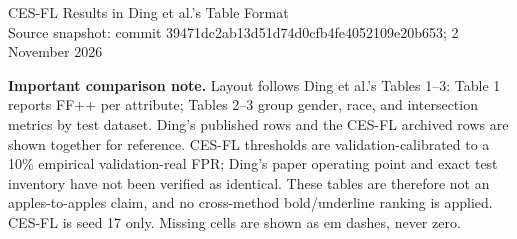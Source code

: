\documentclass[9pt]{article}
\begin{document}
\begin{center}{\LARGE CES-FL Results in Ding et al.'s Table Format}\\[3pt]
{\small Source snapshot: commit 39471dc2ab13d51d74d0cfb4fe4052109e20b653; 2 November 2026}\end{center}
\textbf{Important comparison note.} Layout follows Ding et al.'s Tables 1--3: Table 1 reports FF++ per attribute; Tables 2--3 group gender, race, and intersection metrics by test dataset. Ding's published rows and the CES-FL archived rows are shown together for reference. CES-FL thresholds are validation-calibrated to a 10\% empirical validation-real FPR; Ding's paper operating point and exact test inventory have not been verified as identical. These tables are therefore not an apples-to-apples claim, and no cross-method bold/underline ranking is applied. CES-FL is seed 17 only. Missing cells are shown as em dashes, never zero.
\end{document}
